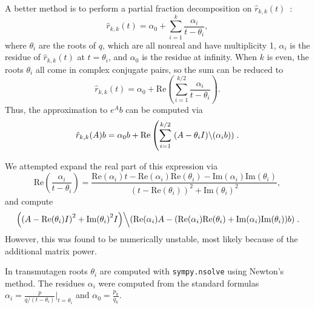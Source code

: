 A better method is to perform a partial fraction decomposition on $\hat{r}_{k,
  k}(t)$~\cite{pusa2010computing}:
\begin{equation}
\label{eq:part-frac}
  \hat{r}_{k, k}(t) = \alpha_0 + \sum_{i=1}^k \frac{\alpha_i}{t - \theta_i},
\end{equation}
where $\theta_i$ are the roots of $q$, which are all
nonreal and have multiplicity 1, $\alpha_i$ is the residue of
$\hat{r}_{k, k}(t)$ at $t=\theta_i$, and $\alpha_0$ is the residue at
infinity. When $k$ is even, the roots $\theta_i$ all come in complex conjugate
pairs, so the sum can be reduced to
\begin{equation}
  \hat{r}_{k, k}(t) = \alpha_0 + \mathrm{Re}\left(\sum_{i=1}^{k/2}
    \frac{\alpha_i}{t - \theta_i}\right).
\end{equation}
Thus, the approximation to $e^Ab$ can be computed via
\begin{equation}
\label{eq:part-frac-matrix-re}
  \hat{r}_{k, k}(A)b = \alpha_0b + \mathrm{Re}\left(\sum_{i=1}^{k/2} \left. (A -
    \theta_i I)\middle\backslash(\alpha_i b) \right)\right..
\end{equation}

We attempted expand the real part of this expression via
\begin{equation}
\mathrm{Re}\left(\frac{\alpha_i}{t - \theta_i}\right) = \frac{\mathrm{Re}{(\alpha_{i})}t - \mathrm{Re}{(\alpha_{i})} \mathrm{Re}{(\theta_{i})} - \mathrm{Im}{(\alpha_{i})} \mathrm{Im}{(\theta_{i})}}{\left(t - \mathrm{Re}{(\theta_{i})}\right)^{2} + \mathrm{Im}{(\theta_{i})}^{2}},
\end{equation}
and compute
\begin{equation}
  \left.\left(\left(A - \mathrm{Re}{(\theta_{i})I}\right)^{2} +
  \mathrm{Im}{(\theta_{i})}^{2}I\right)\middle\backslash \left(\mathrm{Re}{(\alpha_{i})}A - (\mathrm{Re}{(\alpha_{i})} \mathrm{Re}{(\theta_{i})} + \mathrm{Im}{(\alpha_{i})} \mathrm{Im}{(\theta_{i})})b\right)\right..
\end{equation}
However, this was found to be numerically unstable, most likely because of the
additional matrix power. %

In transmutagen roots $\theta_i$ are computed with
\texttt{sympy.\allowbreak{}nsolve} using Newton's method.  The residues
$\alpha_i$ were computed from the standard formulas
$\alpha_i = \frac{p}{q/(t - \theta_i)}|_{t=\theta_i}$ and
$\alpha_0=\frac{p_k}{q_k}$.
